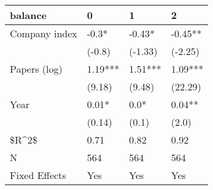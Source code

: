 \begin{tabular}{llll}
\toprule
       balance &        0 &        1 &        2 \\
\midrule
 Company index &    -0.3* &   -0.43* &  -0.45** \\
               &   (-0.8) &  (-1.33) &  (-2.25) \\
  Papers (log) &  1.19*** &  1.51*** &  1.09*** \\
               &   (9.18) &   (9.48) &  (22.29) \\
          Year &    0.01* &     0.0* &   0.04** \\
               &   (0.14) &    (0.1) &    (2.0) \\
         \$R\textasciicircum 2\$ &     0.71 &     0.82 &     0.92 \\
             N &      564 &      564 &      564 \\
 Fixed Effects &      Yes &      Yes &      Yes \\
\bottomrule
\end{tabular}

